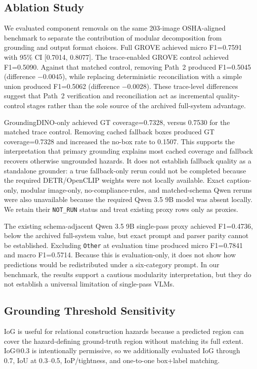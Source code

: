 \subsection{Ablation Study}

We evaluated component removals on the same 203-image OSHA-aligned benchmark to
separate the contribution of modular decomposition from grounding and output
format choices. Full GROVE achieved micro F1=0.7591 with 95\% CI
[0.7014, 0.8077]. The trace-enabled GROVE control achieved
F1=0.5090. Against that matched control, removing Path~2
produced F1=0.5045 (difference $-0.0045$), while replacing
deterministic reconciliation with a simple union produced
F1=0.5062 (difference $-0.0028$). These trace-level differences
suggest that Path~2 verification and reconciliation act as incremental
quality-control stages rather than the sole source of the archived full-system
advantage.

GroundingDINO-only achieved GT coverage=0.7328, versus
0.7530 for the matched trace control. Removing cached
fallback boxes produced GT coverage=0.7328 and increased
the no-box rate to 0.1507. This supports the interpretation
that primary grounding explains most cached coverage and fallback recovers
otherwise ungrounded hazards. It does not establish fallback quality as a
standalone grounder: a true fallback-only rerun could not be completed because
the required DETR/OpenCLIP weights were not locally available. Exact
caption-only, modular image-only, no-compliance-rules, and matched-schema Qwen
reruns were also unavailable because the required Qwen 3.5 9B model was absent
locally. We retain their \texttt{NOT\_RUN} status and treat existing proxy
rows only as proxies.

The existing schema-adjacent Qwen 3.5 9B single-pass proxy achieved
F1=0.4736, below the archived full-system value, but exact
prompt and parser parity cannot be established. Excluding \texttt{Other} at
evaluation time produced micro F1=0.7841 and macro
F1=0.5714. Because this is evaluation-only, it does not show
how predictions would be redistributed under a six-category prompt. In our
benchmark, the results support a cautious modularity interpretation, but they
do not establish a universal limitation of single-pass VLMs.

\subsection{Grounding Threshold Sensitivity}

IoG is useful for relational construction hazards because a predicted region
can cover the hazard-defining ground-truth region without matching its full
extent. IoG@0.3 is intentionally permissive, so we additionally evaluated IoG
through 0.7, IoU at 0.3--0.5, IoP/tightness, and one-to-one box+label matching.

